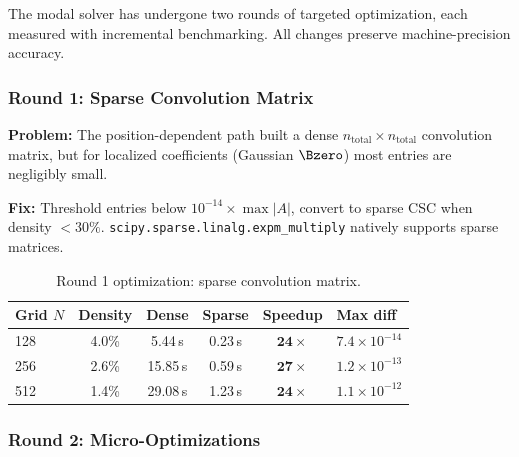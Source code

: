 The modal solver has undergone two rounds of targeted optimization, each measured with incremental benchmarking. All changes preserve machine-precision accuracy.

\subsubsection{Round 1: Sparse Convolution Matrix}
\label{sec:modal-opt-round1}

\textbf{Problem:} The position-dependent path built a dense $n_\text{total}\times n_\text{total}$ convolution matrix, but for localized coefficients (Gaussian $\Bzero$) most entries are negligibly small.

\textbf{Fix:} Threshold entries below $10^{-14} \times \max|A|$, convert to sparse CSC when density $< 30\%$. \texttt{scipy.sparse.linalg.expm\_multiply} natively supports sparse matrices.

\begin{table}[htbp]
\centering
\caption{Round 1 optimization: sparse convolution matrix.}
\label{tab:modal-opt-round1}
\begin{tabular}{@{}lccccl@{}}
\toprule
Grid $N$ & Density & Dense & Sparse & Speedup & Max diff \\
\midrule
128 & 4.0\% & 5.44\,s & 0.23\,s & $\mathbf{24\times}$ & $7.4\times 10^{-14}$ \\
256 & 2.6\% & 15.85\,s & 0.59\,s & $\mathbf{27\times}$ & $1.2\times 10^{-13}$ \\
512 & 1.4\% & 29.08\,s & 1.23\,s & $\mathbf{24\times}$ & $1.1\times 10^{-12}$ \\
\bottomrule
\end{tabular}
\end{table}

\subsubsection{Round 2: Micro-Optimizations}
\label{sec:modal-opt-round2}

